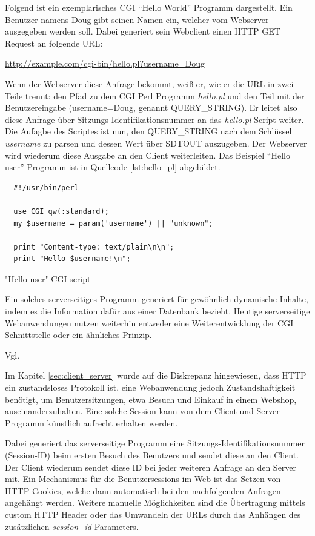 Folgend ist ein exemplarisches CGI \enquote{Hello World} Programm dargestellt. Ein Benutzer namens Doug gibt seinen Namen ein, welcher vom Webserver ausgegeben werden soll. Dabei generiert sein Webclient einen HTTP GET Request an folgende URL:

\url{http://example.com/cgi-bin/hello.pl?username=Doug}


Wenn der Webserver diese Anfrage bekommt, weiß er, wie er die URL in zwei Teile trennt: den Pfad zu dem CGI Perl Programm \emph{hello.pl} und den Teil mit der Benutzereingabe (username=Doug, genannt QUERY\_STRING). Er leitet also diese Anfrage über Sitzungs-Identifikationsnummer an das \emph{hello.pl} Script weiter. Die Aufagbe des Scriptes ist nun, den QUERY\_STRING nach dem Schlüssel \emph{username} zu parsen und dessen Wert über SDTOUT auszugeben. Der Webserver wird wiederum diese Ausgabe an den Client weiterleiten. Das Beispiel \enquote{Hello user} Programm ist in Quellcode \ref{lst:hello_pl} abgebildet.

\begin{listing}[H]
\begin{verbatim}
  #!/usr/bin/perl

  use CGI qw(:standard);
  my $username = param('username') || "unknown";

  print "Content-type: text/plain\n\n";
  print "Hello $username!\n";
\end{verbatim}
\caption{"Hello user" CGI script}
\label{lst:hello_pl}
\end{listing}

Ein solches serverseitiges Programm generiert für gewöhnlich dynamische Inhalte, indem es die Information dafür aus einer Datenbank bezieht. Heutige serverseitige Webanwendungen nutzen weiterhin entweder eine Weiterentwicklung der CGI Schnittstelle oder ein ähnliches Prinzip.

Vgl. \cite[Kap. 1.1]{Bekman:2003}

Im Kapitel \ref{sec:client_server} wurde auf die Diskrepanz hingewiesen, dass HTTP ein zustandsloses Protokoll ist, eine Webanwendung jedoch Zustandshaftigkeit benötigt, um Benutzersitzungen, etwa Besuch und Einkauf in einem Webshop, auseinanderzuhalten. Eine solche Session kann von dem Client und Server Programm
künstlich aufrecht erhalten werden.

Dabei generiert das serverseitige Programm eine Sitzungs-Identifikationsnummer (Session-ID) beim ersten Besuch des Benutzers und sendet diese an den Client. Der Client wiederum sendet diese  ID bei jeder weiteren Anfrage an den Server mit. Ein Mechanismus für die Benutzersessions im Web ist das Setzen von HTTP-Cookies, welche dann automatisch bei den nachfolgenden Anfragen angehängt werden. Weitere manuelle Möglichkeiten sind die Übertragung mittels custom HTTP Header oder das Umwandeln der URLs durch das Anhängen des zusätzlichen \emph{session\_id} Parameters.

